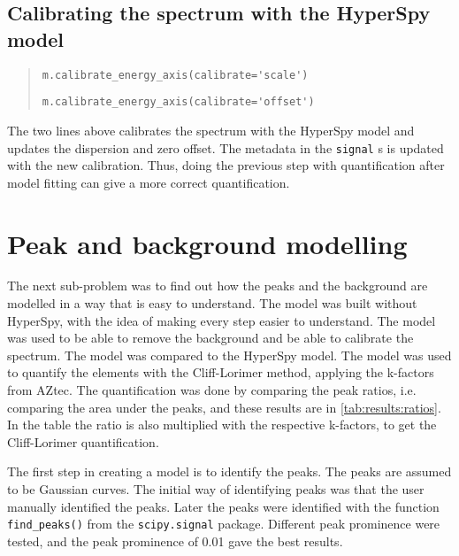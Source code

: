 \subsection{Calibrating the spectrum with the HyperSpy model}
\label{sec:discussion:steps:HyperSpycalibration}

\begin{quote}

    \verb|m.calibrate_energy_axis(calibrate='scale')|

    \verb|m.calibrate_energy_axis(calibrate='offset')|

\end{quote}

The two lines above calibrates the spectrum with the HyperSpy model and updates the dispersion and zero offset.
The metadata in the \verb|signal| s is updated with the new calibration.
Thus, doing the previous step with quantification after model fitting can give a more correct quantification.
%
%
%

%
%
\section{Peak and background modelling}
\label{sec:discussion:modelling}

The next sub-problem was to find out how the peaks and the background are modelled in a way that is easy to understand.
The model was built without HyperSpy, with the idea of making every step easier to understand.
The model was used to be able to remove the background and be able to calibrate the spectrum.
The model was compared to the HyperSpy model.
The model was used to quantify the elements with the Cliff-Lorimer method, applying the k-factors from AZtec.
The quantification was done by comparing the peak ratios, i.e. comparing the area under the peaks, and these results are in \cref{tab:results:ratios}.
In the table the ratio is also multiplied with the respective k-factors, to get the Cliff-Lorimer quantification.


The first step in creating a model is to identify the peaks.
The peaks are assumed to be Gaussian curves.
The initial way of identifying peaks was that the user manually identified the peaks.
Later the peaks were identified with the function \verb|find_peaks()| from the \verb|scipy.signal| package.
Different peak prominence were tested, and the peak prominence of 0.01 gave the best results.


